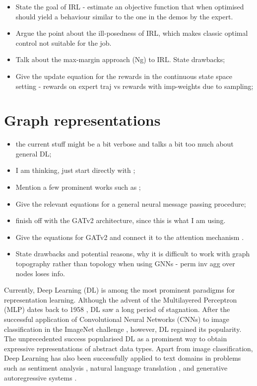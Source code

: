 \documentclass{report}
\numberwithin{equation}{section}
\numberwithin{figure}{section}
\numberwithin{table}{section}
\numberwithin{algorithm}{section}
\begin{document}
\begin{itemize}
  \item State the goal of IRL - estimate an objective function
    that when optimised should yield a behaviour similar to the 
    one in the demos by the expert.
  \item Argue the point about the ill-posedness of IRL, which makes 
    classic optimal control not suitable for the job.
  \item Talk about the max-margin approach (Ng) to IRL.
    State drawbacks;
  \item Give the update equation for the rewards in the 
  continuous state space setting - rewards on expert traj 
  vs rewards with imp-weights due to sampling;
\end{itemize}

\chapter{Graph representations}\label{chap:GNNs}
\begin{itemize}
  \item the current stuff might be a bit verbose and talks 
  a bit too much about general DL; 
  \item I am thinking, just start directly with \cite{ScarselliGNN};
  \item Mention a few prominent works such as \cite{MPNNs,GCN};
  \item Give the relevant equations for a general neural message 
  passing procedure;
  \item finish off with the GATv2 \citep{GATv2} architecture, 
  since this is what I am using.
  \item Give the equations for GATv2 and connect it to the 
  attention mechanism \citep{transformers}.
  \item State drawbacks and potential reasons, why it is difficult 
    to work with graph topography rather than topology when using 
    GNNs - perm inv agg over nodes loses info.
\end{itemize}
Currently, Deep Learning (DL) is among the most prominent paradigms 
for representation learning. Although the advent of the 
Multilayered Perceptron (MLP) dates back to 
1958 \citep{perceptron}, DL saw a long period 
of stagnation. After the successful application of 
Convolutional Neural 
Networks (CNNs) \citep{CNNsLecun} to image classification
in the ImageNet challenge 
\citep{alexnet,imagenet}, however, DL regained 
its popularity. The unprecedented success 
popularised DL as a prominent way 
to obtain expressive representations of abstract data types. 
Apart from image classification, 
Deep Learning has also been successfully 
applied to text domains in problems such as 
sentiment analysis \citep{SentimentRNN,textCNN,BERT},  
natural language translation \citep{nlpTranslation},
and generative autoregressive systems \citep{GPT,GPT2020}.
\end{document}
